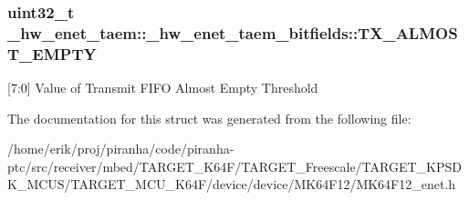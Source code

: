 \subsubsection[{\texorpdfstring{T\+X\+\_\+\+A\+L\+M\+O\+S\+T\+\_\+\+E\+M\+P\+TY}{TX_ALMOST_EMPTY}}]{\setlength{\rightskip}{0pt plus 5cm}uint32\+\_\+t \+\_\+hw\+\_\+enet\+\_\+taem\+::\+\_\+hw\+\_\+enet\+\_\+taem\+\_\+bitfields\+::\+T\+X\+\_\+\+A\+L\+M\+O\+S\+T\+\_\+\+E\+M\+P\+TY}\hypertarget{struct__hw__enet__taem_1_1__hw__enet__taem__bitfields_aba03483c4568a3d8bc68233c9a10f709}{}\label{struct__hw__enet__taem_1_1__hw__enet__taem__bitfields_aba03483c4568a3d8bc68233c9a10f709}
\mbox{[}7\+:0\mbox{]} Value of Transmit F\+I\+FO Almost Empty Threshold 

The documentation for this struct was generated from the following file\+:\begin{DoxyCompactItemize}
\item 
/home/erik/proj/piranha/code/piranha-\/ptc/src/receiver/mbed/\+T\+A\+R\+G\+E\+T\+\_\+\+K64\+F/\+T\+A\+R\+G\+E\+T\+\_\+\+Freescale/\+T\+A\+R\+G\+E\+T\+\_\+\+K\+P\+S\+D\+K\+\_\+\+M\+C\+U\+S/\+T\+A\+R\+G\+E\+T\+\_\+\+M\+C\+U\+\_\+\+K64\+F/device/device/\+M\+K64\+F12/M\+K64\+F12\+\_\+enet.\+h\end{DoxyCompactItemize}
